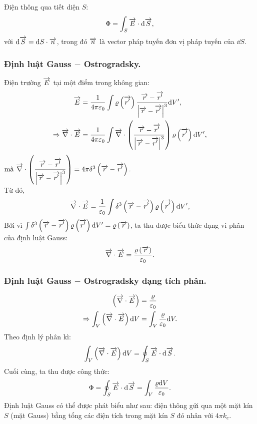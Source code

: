 \begin{appendices}
\begin{center}

\end{center}
    Điện thông qua tiết diện $S$:
    $$\Phi=\int_S \overrightarrow{E}\cdot \mathrm{d} \overrightarrow{S},$$
    với $\mathrm{d}\overrightarrow{S}=\mathrm{d} S\cdot \overrightarrow{n}$, trong đó $\overrightarrow{n}$ là vector pháp tuyến đơn vị pháp tuyến của $\dd S$.
    \subsubsection{Định luật Gauss $-$ Ostrogradsky.}
    Điện trường $\overrightarrow{E}$ tại một điểm trong không gian:
\begin{align*}
    \overrightarrow{E}&=\dfrac{1}{4\pi \varepsilon_0}\int\varrho\left(\overrightarrow{r'}\right)\dfrac{\overrightarrow{r}-\overrightarrow{r'}}{\left|\overrightarrow{r}-\overrightarrow{r'}\right|^3}\mathrm{d} V',\\
    \Rightarrow \overrightarrow{\nabla}\cdot\overrightarrow{E}&=\dfrac{1}{4\pi \varepsilon_0}\int\overrightarrow{\nabla}\cdot\left(\dfrac{\overrightarrow{r}-\overrightarrow{r'}}{\left|\overrightarrow{r}-\overrightarrow{r'}\right|^3}\right)\varrho\left(\overrightarrow{r'}\right)\mathrm{d} V',
\end{align*}
$\text{mà } \overrightarrow{\nabla}\cdot\left(\dfrac{\overrightarrow{r}-\overrightarrow{r'}}{\left|\overrightarrow{r}-\overrightarrow{r'}\right|^3}\right)=4\pi\delta^3\left(\overrightarrow{r}-\overrightarrow{r'}\right).$\\
Từ đó,\\
$$\overrightarrow{\nabla}\cdot\overrightarrow{E}=\dfrac{1}{ \varepsilon_0}\int\delta^3\left(\overrightarrow{r}-\overrightarrow{r'}\right)\varrho\left(\overrightarrow{r'}\right)\mathrm{d} V',$$
Bởi vì $\int{\delta^3\left(\overrightarrow{r}-\overrightarrow{r'}\right)\varrho\left(\overrightarrow{r'}\right)\mathrm{d}V'}=\varrho\left(\overrightarrow{r}\right)$, ta thu được biểu thức dạng vi phân của định luật Gauss:
$$\overrightarrow{\nabla}\cdot\overrightarrow{E}=\dfrac{\varrho\left(\overrightarrow{r}\right)}{ \varepsilon_0}.$$
\subsubsection{Định luật Gauss $-$ Ostrogradsky dạng tích phân.}
    \begin{align*}
      \left(\overrightarrow{\nabla}\cdot \overrightarrow{E}\right)&=\dfrac{\varrho}{ \varepsilon_0}\\
      \Rightarrow  \int_{V}\left(\overrightarrow{\nabla}\cdot \overrightarrow{E}\right)\mathrm{d} V&=\int_{V}\dfrac{\varrho}{ \varepsilon_0}\mathrm{d} V.
    \end{align*}
    Theo định lý phân kì:
    $$\int_{V}\left(\overrightarrow{\nabla}\cdot \overrightarrow{E}\right)\mathrm{d} V=\oint_{S}\overrightarrow{E}\cdot \mathrm{d}\overrightarrow{S}. $$
    Cuối cùng, ta thu được công thức:\\
    $$\Phi=\oint_{S}\overrightarrow{E}\cdot \mathrm{d}\overrightarrow{S}=\int_{V}\dfrac{\varrho\mathrm{d} V}{ \varepsilon_0} .$$
    Định luật Gauss có thể được phát biểu như sau: điện thông gửi qua một mặt kín $S$ (mặt Gauss) bằng tổng các điện tích trong mặt kín $S$ đó nhân với $4\pi k_e$.

\end{appendices}
